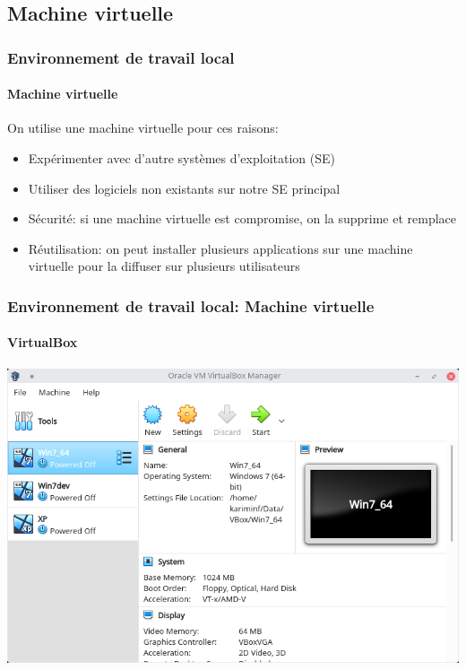 \documentclass{beamer}
\begin{document}
\subsection{Machine virtuelle}

\begin{frame}
\frametitle{Environnement de travail local}
\framesubtitle{Machine virtuelle}

On utilise une machine virtuelle pour ces raisons:
\begin{itemize}
	\item Expérimenter avec d'autre systèmes d'exploitation (SE)
	\item Utiliser des logiciels non existants sur notre SE principal
	\item Sécurité: si une machine virtuelle est compromise, on la supprime et remplace
	\item Réutilisation: on peut installer plusieurs applications sur une machine virtuelle pour la diffuser sur plusieurs utilisateurs 
\end{itemize}

\end{frame}

\begin{frame}
\frametitle{Environnement de travail local: Machine virtuelle}
\framesubtitle{VirtualBox}

\begin{center}
	\includegraphics[height=
.8\textheight]{../img/Bweb01-environnement/vbox.png}
\end{center}

\end{frame}
\end{document}
